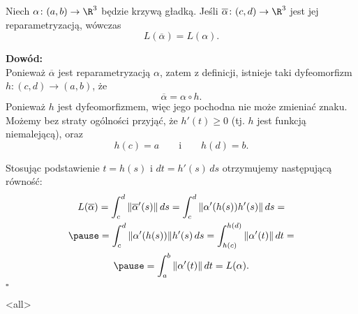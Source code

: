 \begin{frame}
\begin{lemat}
Niech $\alpha\colon(a,b)\to \R^3$ będzie krzywą gładką. Jeśli $\overline{\alpha}\colon (c,d)\to \R^3$ jest jej reparametryzacją, wówczas \[L(\overline{\alpha})=L(\alpha).\]
\end{lemat}

\pause \textcolor{ared}{\textbf{Dowód:}}\\
Ponieważ $\overline{\alpha}$ jest reparametryzacją $\alpha$, zatem z definicji, istnieje taki dyfeomorfizm $h\colon (c,d)\to (a,b)$, że \[\overline{\alpha}=\alpha\circ h.\] \pause Ponieważ $h$ jest dyfeomorfizmem, więc jego pochodna nie może zmieniać znaku.  Możemy bez straty ogólności przyjąć, że $h'(t)\geqslant 0$ (tj. $h$ jest funkcją niemalejącą), oraz \[h(c)=a\qquad \text{i}\qquad h(d)=b.\]
\end{frame}
\begin{frame}[<+->]
Stosując podstawienie $t=h(s)$ i $dt=h'(s)\,ds$ otrzymujemy następującą równość:\pause 
\begin{multline*}
L(\overline{\alpha})=\int_c^d\|\overline{\alpha}'(s)\|\,ds=\int_c^d\|\alpha'(h(s))h'(s)\|\,ds=\\
\pause=\int_c^d\|\alpha'(h(s))\|h'(s)\,ds=\int_{h(c)}^{h(d)}\|\alpha'(t)\|\, dt=\\
\pause=\int_{a}^{b}\|\alpha'(t)\|\, dt=L(\alpha).
\end{multline*}
\hfill $\square$

\end{frame}

\mode<all> 
